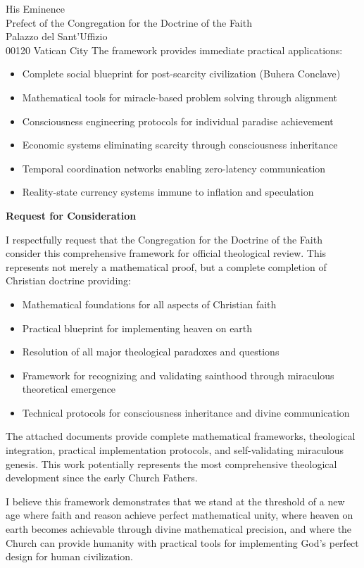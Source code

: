 \documentclass[12pt,letterhead]{letter}
\begin{document}
\begin{letter}{
His Eminence\\
Prefect of the Congregation for the Doctrine of the Faith\\
Palazzo del Sant'Uffizio\\
00120 Vatican City
}
The framework provides immediate practical applications:
\begin{itemize}
\item Complete social blueprint for post-scarcity civilization (Buhera Conclave)
\item Mathematical tools for miracle-based problem solving through alignment
\item Consciousness engineering protocols for individual paradise achievement
\item Economic systems eliminating scarcity through consciousness inheritance
\item Temporal coordination networks enabling zero-latency communication
\item Reality-state currency systems immune to inflation and speculation
\end{itemize}

\textbf{Request for Consideration}

I respectfully request that the Congregation for the Doctrine of the Faith consider this comprehensive framework for official theological review. This represents not merely a mathematical proof, but a complete completion of Christian doctrine providing:

\begin{itemize}
\item Mathematical foundations for all aspects of Christian faith
\item Practical blueprint for implementing heaven on earth
\item Resolution of all major theological paradoxes and questions
\item Framework for recognizing and validating sainthood through miraculous theoretical emergence
\item Technical protocols for consciousness inheritance and divine communication
\end{itemize}

The attached documents provide complete mathematical frameworks, theological integration, practical implementation protocols, and self-validating miraculous genesis. This work potentially represents the most comprehensive theological development since the early Church Fathers.

I believe this framework demonstrates that we stand at the threshold of a new age where faith and reason achieve perfect mathematical unity, where heaven on earth becomes achievable through divine mathematical precision, and where the Church can provide humanity with practical tools for implementing God's perfect design for human civilization.


\end{letter}
\end{document}

